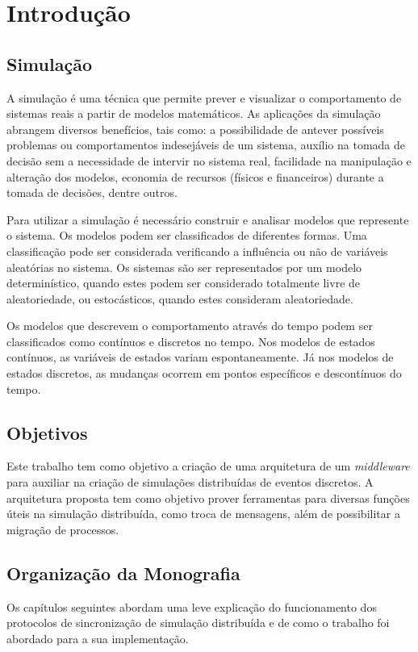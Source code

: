 \chapter{Introdução}
\section{Simulação}

A simulação é uma técnica que permite prever e visualizar o comportamento de sistemas reais a partir de modelos matemáticos. As aplicações da simulação abrangem diversos benefícios, tais como: a possibilidade de antever possíveis problemas ou comportamentos indesejáveis de um sistema, auxílio na tomada de decisão sem a necessidade de intervir no sistema real, facilidade na manipulação e alteração dos modelos, economia de recursos (físicos e financeiros) durante a tomada de decisões, dentre outros.

Para utilizar a simulação é necessário construir e analisar modelos que represente o sistema. Os modelos podem ser classificados de diferentes formas. Uma classificação pode ser considerada verificando a influência ou não de variáveis aleatórias no sistema. Os sistemas são ser representados por um modelo determinístico, quando estes podem ser considerado totalmente livre de aleatoriedade, ou estocásticos, quando estes consideram aleatoriedade.

Os modelos que descrevem o comportamento através do tempo podem ser classificados como contínuos e discretos no tempo. Nos modelos de estados contínuos, as variáveis de estados variam espontaneamente. Já nos modelos de estados discretos, as mudanças ocorrem em pontos específicos e descontínuos do tempo.

\section{Objetivos}
Este trabalho tem como objetivo a criação de uma arquitetura de um \textit{middleware} para auxiliar na criação de simulações distribuídas de eventos discretos. A arquitetura proposta tem como objetivo prover ferramentas para diversas funções úteis na simulação distribuída, como troca de mensagens, além de possibilitar a migração de processos.

\section{Organização da Monografia}
Os capítulos seguintes abordam uma leve explicação do funcionamento dos protocolos de sincronização de simulação distribuída e de como o trabalho foi abordado para a sua implementação.

